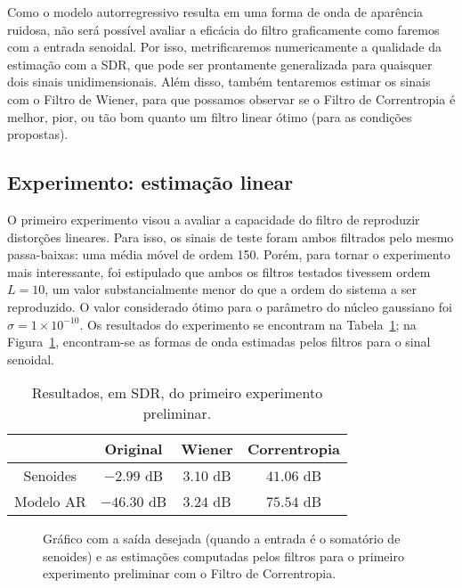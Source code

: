 Como o modelo autorregressivo resulta em uma forma de onda de aparência ruidosa, não
será possível avaliar a eficácia do filtro graficamente como faremos com a entrada
senoidal. Por isso, metrificaremos numericamente a qualidade da estimação com a SDR,
que pode ser prontamente generalizada para quaisquer dois sinais unidimensionais. Além
disso, também tentaremos estimar os sinais com o Filtro de Wiener, para que possamos
observar se o Filtro de Correntropia é melhor, pior, ou tão bom quanto um filtro linear
ótimo (para as condições propostas).

\subsection{Experimento: estimação linear}

O primeiro experimento visou a avaliar a capacidade do filtro de reproduzir distorções
lineares. Para isso, os sinais de teste foram ambos filtrados pelo mesmo passa-baixas:
uma média móvel de ordem 150. Porém, para tornar o experimento mais interessante, foi
estipulado que ambos os filtros testados tivessem ordem $L = 10$, um valor
substancialmente menor do que a ordem do sistema a ser reproduzido. O valor considerado
ótimo para o parâmetro do núcleo gaussiano foi $\sigma = 1 \times 10^{-10}$. Os
resultados do experimento se encontram na
Tabela~\ref{tab:correntropy:poc-experiment-1}; na
Figura~\ref{fig:correntropy:poc-experiment-1}, encontram-se as formas de onda estimadas
pelos filtros para o sinal senoidal. {\def\arraystretch{1.25}\tabcolsep=10pt
		\begin{table}[!ht]
			\centering
			\caption[Resultados do primeiro experimento preliminar: estimação linear]{Resultados, em SDR, do primeiro experimento preliminar.}
			\label{tab:correntropy:poc-experiment-1}
			\begin{tabular}{cccc}
				\toprule
				          & Original    & Wiener    & Correntropia \\ \midrule
				Senoides  & $-2.99$ dB  & $3.10$ dB & $41.06$ dB   \\
				Modelo AR & $-46.30$ dB & $3.24$ dB & $75.54$ dB   \\ \bottomrule
			\end{tabular}
		\end{table}
	}
\begin{figure}[!ht]
	\centering
	
	\caption[Saída desejada e estimações do primeiro experimento preliminar]{Gráfico com a saída desejada (quando a entrada é o somatório de senoides) e as estimações computadas pelos filtros para o primeiro experimento preliminar com o Filtro de Correntropia.}
	\label{fig:correntropy:poc-experiment-1}
\end{figure}

